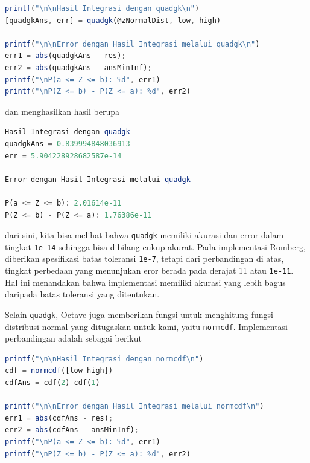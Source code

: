 \documentclass[journal,12pt,onecolumn,a4paper]{IEEEtran}
\begin{document}
\begin{center}
	\begin{lstlisting}[language=Octave]
printf("\n\nHasil Integrasi dengan quadgk\n")
[quadgkAns, err] = quadgk(@zNormalDist, low, high)

printf("\n\nError dengan Hasil Integrasi melalui quadgk\n")
err1 = abs(quadgkAns - res);
err2 = abs(quadgkAns - ansMinInf);
printf("\nP(a <= Z <= b): %d", err1)
printf("\nP(Z <= b) - P(Z <= a): %d", err2)
	\end{lstlisting}
\end{center}

dan menghasilkan hasil berupa

\begin{center}
	\begin{lstlisting}[language=Octave]
Hasil Integrasi dengan quadgk
quadgkAns = 0.839994848036913
err = 5.904228928682587e-14

Error dengan Hasil Integrasi melalui quadgk

P(a <= Z <= b): 2.01614e-11
P(Z <= b) - P(Z <= a): 1.76386e-11
	\end{lstlisting}
\end{center}

dari sini, kita bisa melihat bahwa \lstinline{quadgk} memiliki akurasi dan error dalam tingkat \lstinline{1e-14} sehingga bisa dibilang cukup akurat. Pada implementasi Romberg, diberikan spesifikasi batas toleransi \lstinline{1e-7}, tetapi dari perbandingan di atas, tingkat perbedaan yang menunjukan eror berada pada derajat 11 atau \lstinline{1e-11}.
Hal ini menandakan bahwa implementasi memiliki akurasi yang lebih bagus daripada batas toleransi yang ditentukan.

Selain \lstinline{quadgk}, Octave juga memberikan fungsi untuk menghitung fungsi distribusi normal yang ditugaskan untuk kami, yaitu \lstinline{normcdf}. Implementasi perbandingan adalah sebagai berikut

\begin{center}
	\begin{lstlisting}[language=Octave]
printf("\n\nHasil Integrasi dengan normcdf\n")
cdf = normcdf([low high])
cdfAns = cdf(2)-cdf(1)

printf("\n\nError dengan Hasil Integrasi melalui normcdf\n")
err1 = abs(cdfAns - res);
err2 = abs(cdfAns - ansMinInf);
printf("\nP(a <= Z <= b): %d", err1)
printf("\nP(Z <= b) - P(Z <= a): %d", err2)
	\end{lstlisting}
\end{center}
\end{document}
